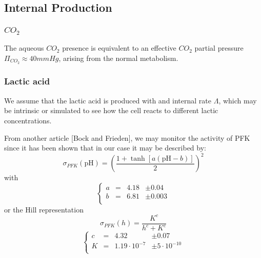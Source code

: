 \documentclass{revtex4}
\begin{document}
\subsection{Internal Production}

\subsubsection{$CO_2$}
The aqueous $CO_2$ presence is equivalent to an effective $CO_2$ partial pressure $\Pi_{CO_2}\approx 40mmHg$,
arising from the normal metabolism.

\subsubsection{Lactic acid}
We assume that the lactic acid is produced with and internal rate $\Lambda$, which may be
intrinsic or simulated to see how the cell reacts to different lactic concentrations.

From another article [Bock and Frieden], we may monitor the activity of PFK since it has
been shown that in our case it may be described by:
\begin{equation}
\sigma_{PFK}\left(\mathrm{pH}\right)  = \left(\dfrac{1+\tanh\left[ a \left(\mathrm{pH}-b\right)\right] }{2}\right)^2
\end{equation}
with
\begin{equation}
	\left\lbrace
	\begin{array}{rcll}
	a & = & 4.18 & \pm 0.04\\
	b & = & 6.81 & \pm 0.003\\
	\end{array}
	\right.
\end{equation}
or the Hill representation
\begin{equation}
	\sigma_{PFK}\left(h\right) = \dfrac{K^c}{h^c+K^c}
\end{equation}
\begin{equation}
	\left\lbrace
	\begin{array}{rcll}
	c & = & 4.32 & \pm 0.07\\
	K & = & 1.19\cdot10^{-7} & \pm 5\cdot10^{-10}\\
	\end{array}
	\right.
\end{equation}
\end{document}
